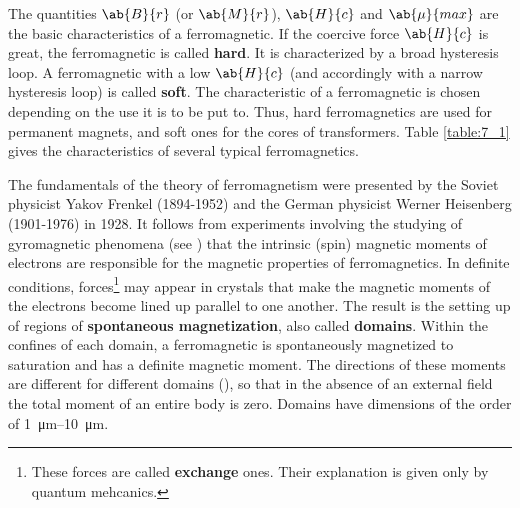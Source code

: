 The quantities $\ab{B}{r}$ (or $\ab{M}{r}$), $\ab{H}{c}$ and $\ab{\mu}{max}$ are the basic characteristics of a ferromagnetic.
If the coercive force $\ab{H}{c}$ is great, the ferromagnetic is called \textbf{hard}.
It is characterized by a broad hysteresis loop.
A ferromagnetic with a low $\ab{H}{c}$ (and accordingly with a narrow hysteresis loop) is called \textbf{soft}.
The characteristic of a ferromagnetic is chosen depending on the use it is to be put to.
Thus, hard ferromagnetics are used for permanent magnets, and soft ones for the cores of transformers.
Table \ref{table:7_1} gives the characteristics of several typical ferromagnetics.

\begin{table}[!htb]
	\renewcommand{\arraystretch}{1.2}
	\caption{}
	\vspace{-0.6cm}
	\label{table:7_1}
	\begin{center}\end{center}
\end{table}

The fundamentals of the theory of ferromagnetism were presented by the Soviet physicist Yakov Frenkel (1894-1952) and the German physicist Werner Heisenberg (1901-1976) in 1928.
It follows from experiments involving the studying of gyromagnetic phenomena (see ) that the intrinsic (spin) magnetic moments of electrons are responsible for the magnetic properties of ferromagnetics.
In definite conditions, forces\footnote{These forces are called \textbf{exchange} ones. Their explanation is given only by quantum mehcanics.} may appear in crystals that make the magnetic moments of the electrons become lined up parallel to one another.
The result is the setting up of regions of \textbf{spontaneous magnetization}, also called \textbf{domains}.
Within the confines of each domain, a ferromagnetic is spontaneously magnetized to saturation and has a definite magnetic moment.
The directions of these moments are different for different domains (), so that in the absence of an external field the total moment of an entire body is zero.
Domains have dimensions of the order of \SIrange{1}{10}{\micro\metre}.

